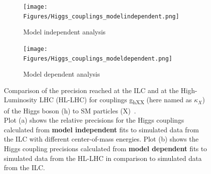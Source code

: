  \begin{figure}[!h]
 \centering
  \begin{subfigure}[b]{0.49\textwidth}
   \centering
    \texttt{[image: Figures/Higgs\_couplings\_modelindependent.png]}
   \caption{Model independent analysis}
   \label{fig:Higgs_couplings_a}
   \end{subfigure}
   \hfill
    \begin{subfigure}[b]{0.49\textwidth}
   \centering
    \texttt{[image: Figures/Higgs\_couplings\_modeldependent.png]}
   \caption{Model dependent analysis}
   \label{fig:Higgs_couplings_b}
   \end{subfigure}
   \caption[Higgs coupling precisions for various SM particles in model dependent and independent analyses]{Comparison of the precision reached at the ILC and at the High-Luminosity LHC (HL-LHC) for couplings g\textsubscript{hXX} (here named as $\kappa_X$) of the Higgs boson (h) to SM particles (X)~\cite{HiggsCouplings_Junping}.\\
   Plot (a) shows the relative precisions for the Higgs couplings calculated from \textbf{model independent} fits to simulated data from the ILC with different center-of-mass energies.
   Plot (b) shows the Higgs coupling precisions calculated from \textbf{model dependent} fits to simulated data from the HL-LHC in comparison to simulated data from the ILC.}
   \label{fig:Higgs_couplings}
 \end{figure}

